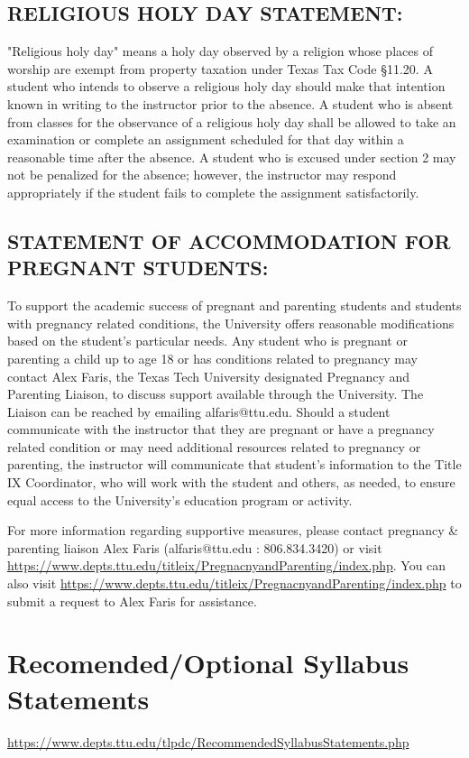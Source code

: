 \documentclass[12pt]{article}
\begin{document}
\subsection*{RELIGIOUS HOLY DAY STATEMENT:}
"Religious holy day" means a holy day observed by a religion whose places of worship are exempt from property taxation under Texas Tax Code §11.20. A student who intends to observe a religious holy day should make that intention known in writing to the instructor prior to the absence. A student who is absent from classes for the observance of a religious holy day shall be allowed to take an examination or complete an assignment scheduled for that day within a reasonable time after the absence. A student who is excused under section 2 may not be penalized for the absence; however, the instructor may respond appropriately if the student fails to complete the assignment satisfactorily.

\subsection*{STATEMENT OF ACCOMMODATION FOR PREGNANT STUDENTS:}
To support the academic success of pregnant and parenting students and students with pregnancy related conditions, the University offers reasonable modifications based on the student's particular needs. Any student who is pregnant or parenting a child up to age 18 or has conditions related to pregnancy may contact Alex Faris, the Texas Tech University designated Pregnancy and Parenting Liaison, to discuss support available through the University. The Liaison can be reached by emailing alfaris@ttu.edu. Should a student communicate with the instructor that they are pregnant or have a pregnancy related condition or may need additional resources related to pregnancy or parenting, the instructor will communicate that student's information to the Title IX Coordinator, who will work with the student and others, as needed, to ensure equal access to the University's education program or activity. 

For more information regarding supportive measures, please contact pregnancy \& parenting liaison Alex Faris (alfaris@ttu.edu : 806.834.3420) or visit \url{https://www.depts.ttu.edu/titleix/PregnacnyandParenting/index.php}. 
You can also visit \url{https://www.depts.ttu.edu/titleix/PregnacnyandParenting/index.php} to submit a request to Alex Faris for assistance.

\section*{Recomended/Optional Syllabus Statements}
\url{https://www.depts.ttu.edu/tlpdc/RecommendedSyllabusStatements.php}
\end{document}
